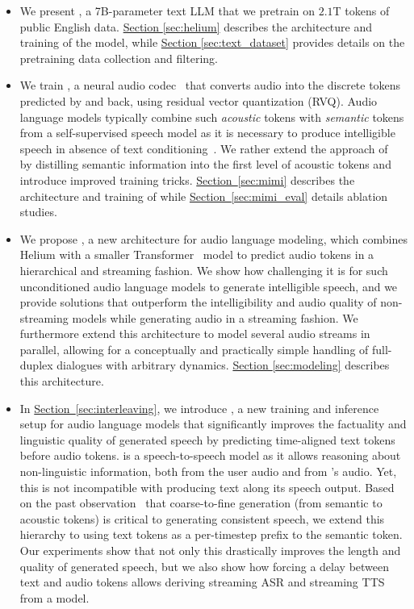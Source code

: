 \begin{itemize}
\item We present \helium, a 7B-parameter text LLM that we pretrain on $2.1$T tokens of public English data. \hyperref[sec:helium]{Section \ref{sec:helium}} describes the architecture and training of the model, while \hyperref[sec:text_dataset]{Section \ref{sec:text_dataset}} provides details on the pretraining data collection and filtering.
\item We train \mimi, a neural audio codec~\citep{soundstream,encodec} that converts audio into the discrete tokens predicted by \ours{} and back, using residual vector quantization (RVQ). Audio language models typically combine such \textit{acoustic} tokens with \textit{semantic} tokens from a self-supervised speech model as it is necessary to produce intelligible speech in absence of text conditioning~\citep{audiolm}. We rather extend the approach of~\citet{zhang2024speechtokenizer} by distilling semantic information into the first level of acoustic tokens and introduce improved training tricks. \hyperref[sec:mimi]{Section~\ref{sec:mimi}} describes the architecture and training of \mimi while \hyperref[sec:mimi_eval]{Section~\ref{sec:mimi_eval}} details ablation studies.
\item We propose \ours{}, a new architecture for audio language modeling, which combines Helium with a smaller Transformer~\citep{attentionvaswani} model to predict audio tokens in a hierarchical and streaming fashion. We show how challenging it is for such unconditioned audio language models to generate intelligible speech, and we provide solutions that outperform the intelligibility and audio quality of non-streaming models while generating audio in a streaming fashion. We furthermore extend this architecture to model several audio streams in parallel, allowing for a conceptually and practically simple handling of full-duplex dialogues with arbitrary dynamics. \hyperref[sec:modeling]{Section \ref{sec:modeling}} describes this architecture.
\item In \hyperref[sec:interleaving]{Section~\ref{sec:interleaving}}, we introduce \interleaving, a new training and inference setup for audio language models that significantly improves the factuality and linguistic quality of generated speech by predicting time-aligned text tokens before audio tokens. \ours{} is a speech-to-speech model as it allows reasoning about non-linguistic information, both from the user audio and from \ours{}'s audio. Yet, this is not incompatible with \ours{} producing text along its speech output. Based on the past observation~\citep{audiolm,zhang2024speechtokenizer} that coarse-to-fine generation (from semantic to acoustic tokens) is critical to generating consistent speech, we extend this hierarchy to using text tokens as a per-timestep prefix to the semantic token. Our experiments show that not only this drastically improves the length and quality of generated speech, but we also show how forcing a delay between text and audio tokens allows deriving streaming ASR and streaming TTS from a \ours{} model.

\end{itemize}
